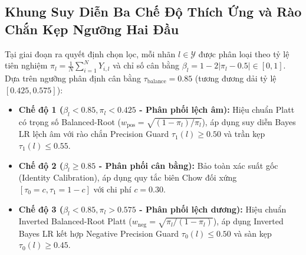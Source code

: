 \documentclass[10pt,a4paper]{article}
\begin{document}
\subsection{Khung Suy Diễn Ba Chế Độ Thích Ứng và Rào Chắn Kẹp Ngưỡng Hai Đầu}
Tại giai đoạn ra quyết định chọn lọc, mỗi nhãn $l \in \mathcal{Y}$ được phân loại theo tỷ lệ tiên nghiệm $\pi_l = \frac{1}{N}\sum_{i=1}^N Y_{i, l}$ và chỉ số cân bằng $\beta_l = 1 - 2|\pi_l - 0.5| \in [0, 1]$. Dựa trên ngưỡng phân định cân bằng $\tau_{\text{balance}} = 0.85$ (tương đương dải tỷ lệ $[0.425, 0.575]$):
\begin{itemize}[leftmargin=*]
    \item \textbf{Chế độ 1 ($\beta_l < 0.85, \pi_l < 0.425$ - Phân phối lệch âm):} Hiệu chuẩn Platt có trọng số Balanced-Root ($w_{\text{pos}} = \sqrt{(1-\pi_l)/\pi_l}$), áp dụng suy diễn Bayes LR lệch âm với rào chắn Precision Guard $\tau_1(l) \ge 0.50$ và trần kẹp $\tau_1(l) \le 0.55$.
    \item \textbf{Chế độ 2 ($\beta_l \ge 0.85$ - Phân phối cân bằng):} Bảo toàn xác suất gốc (Identity Calibration), áp dụng quy tắc biên Chow đối xứng $[\tau_0 = c, \tau_1 = 1 - c]$ với chi phí $c = 0.30$.
    \item \textbf{Chế độ 3 ($\beta_l < 0.85, \pi_l > 0.575$ - Phân phối lệch dương):} Hiệu chuẩn Inverted Balanced-Root Platt ($w_{\text{neg}} = \sqrt{\pi_l / (1-\pi_l)}$), áp dụng Inverted Bayes LR kết hợp Negative Precision Guard $\tau_0(l) \le 0.50$ và sàn kẹp $\tau_0(l) \ge 0.45$.
\end{itemize}
\end{document}
